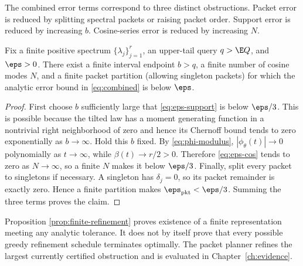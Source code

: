 The combined error terms correspond to three distinct obstructions. Packet error is reduced by splitting spectral packets or raising packet order. Support error is reduced by increasing $b$. Cosine-series error is reduced by increasing $N$.

\begin{proposition}
\label{prop:finite-refinement}
Fix a finite positive spectrum $\{\lambda_j\}_{j=1}^{r}$, an upper-tail query $q>\E Q$, and $\eps>0$. There exist a finite interval endpoint $b>q$, a finite number of cosine modes $N$, and a finite packet partition (allowing singleton packets) for which the analytic error bound in \eqref{eq:combined} is below $\eps$.
\end{proposition}

\begin{proof}
First choose $b$ sufficiently large that \eqref{eq:eps-support} is below $\eps/3$. This is possible because the tilted law has a moment generating function in a nontrivial right neighborhood of zero and hence its Chernoff bound tends to zero exponentially as $b\to\infty$. Hold this $b$ fixed. By \eqref{eq:phi-modulus}, $|\phi_{\theta}(t)|\to0$ polynomially as $t\to\infty$, while $\beta(t)\to r/2>0$. Therefore \eqref{eq:eps-cos} tends to zero as $N\to\infty$, so a finite $N$ makes it below $\eps/3$. Finally, split every packet to singletons if necessary. A singleton has $\delta_j=0$, so its packet remainder is exactly zero. Hence a finite partition makes $\eps_{\mathrm{pkt}}<\eps/3$. Summing the three terms proves the claim.
\end{proof}

\begin{remark}\label{claim:final-26-14}
Proposition \ref{prop:finite-refinement} proves existence of a finite representation meeting any analytic tolerance. It does not by itself prove that every possible greedy refinement schedule terminates optimally. The packet planner refines the largest currently certified obstruction and is evaluated in Chapter~\ref{ch:evidence}.
\end{remark}


